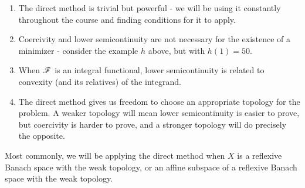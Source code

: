 \begin{remark}
    \begin{enumerate}[label=(\arabic*)]
        \item The direct method is trivial but powerful - we will be using it constantly throughout the course and finding conditions for it to apply.
        \item Coercivity and lower semicontinuity are not necessary for the existence of a minimizer - consider the example $h$ above, but with $h(1) = 50$.
        \item When $\mathscr{F}$ is an integral functional, lower semicontinuity is related to convexity (and its relatives) of the integrand.
        \item The direct method gives us freedom to choose an appropriate topology for the problem. A weaker topology will mean lower semicontinuity is easier to prove, but coercivity is harder to prove, and a stronger topology will do precisely the opposite.
    \end{enumerate}
\end{remark}
Most commonly, we will be applying the direct method when $X$ is a reflexive Banach space with the weak topology, or an affine subspace of a reflexive Banach space with the weak topology.

